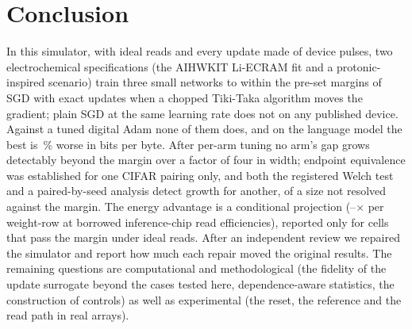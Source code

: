 \section{Conclusion}
In this simulator, with ideal reads and every update made of device pulses, two electrochemical specifications (the AIHWKIT
Li-ECRAM fit and a protonic-inspired scenario) train three small networks to within the pre-set margins of SGD with exact updates
when a chopped Tiki-Taka algorithm moves the gradient; plain SGD at the same learning rate does not on any published device. Against
a tuned digital Adam none of them does, and on the language model the best is \RVLmAdamBestGap\,\% worse in bits per byte. After
per-arm tuning no arm's gap grows detectably beyond the margin over a factor of four in width; endpoint equivalence was established
for one CIFAR pairing only, and both the registered Welch test and a paired-by-seed analysis detect growth for another, of a size
not resolved against the margin. The energy advantage is a
conditional projection (\RVenSysMin--\RVenChipMax$\times$ per weight-row at borrowed inference-chip read efficiencies), reported
only for cells that pass the margin under ideal reads. After an independent review we repaired the simulator and report how much each repair moved the
original results. The remaining questions are computational and methodological (the fidelity of the update surrogate beyond the cases tested
here, dependence-aware statistics, the construction of controls) as well as experimental (the reset, the reference and the read
path in real arrays).
